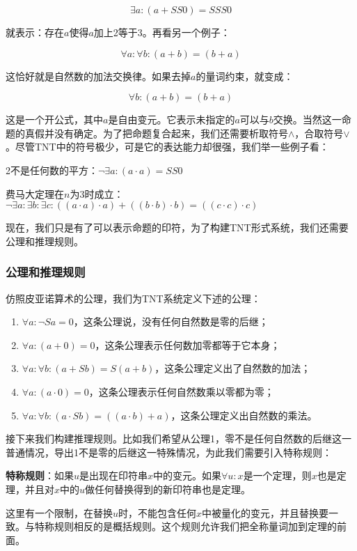 \documentclass{article}
\begin{document}
\[
\exists a : (a + SS0) = SSS0
\]

就表示：存在$a$使得$a$加上2等于3。再看另一个例子：

\[
\forall a : \forall b : (a + b) = (b + a)
\]

这恰好就是自然数的加法交换律。如果去掉$a$的量词约束，就变成：

\[
\forall b : (a + b) = (b + a)
\]

这是一个开公式，其中$a$是自由变元。它表示未指定的$a$可以与$b$交换。当然这一命题的真假并没有确定。为了把命题复合起来，我们还需要析取符号$\land$，合取符号$\lor$。尽管TNT中的符号极少，可是它的表达能力却很强，我们举一些例子看：

2不是任何数的平方：$\lnot \exists a : (a \cdot a) = SS0$

费马大定理在$n$为3时成立：$\lnot \exists a : \exists b : \exists c : ((a \cdot a) \cdot a) + ((b \cdot b) \cdot b) = ((c \cdot c) \cdot c)$

现在，我们只是有了可以表示命题的印符，为了构建TNT形式系统，我们还需要公理和推理规则。

\subsubsection{公理和推理规则}

仿照皮亚诺算术的公理，我们为TNT系统定义下述的公理：

\begin{enumerate}
\item $\forall a : \lnot Sa = 0$，这条公理说，没有任何自然数是零的后继；
\item $\forall a: (a + 0) = 0$，这条公理表示任何数加零都等于它本身；
\item $\forall a: \forall b: (a + Sb) = S(a + b)$，这条公理定义出了自然数的加法；
\item $\forall a: (a \cdot 0) = 0$，这条公理表示任何自然数乘以零都为零；
\item $\forall a: \forall b: (a \cdot Sb) = ((a \cdot b) + a)$，这条公理定义出自然数的乘法。
\end{enumerate}

接下来我们构建推理规则。比如我们希望从公理1，零不是任何自然数的后继这一普通情况，导出1不是零的后继这一特殊情况，为此我们需要引入特称规则：

\textbf{特称规则}：如果$u$是出现在印符串$x$中的变元。如果$\forall u: x$是一个定理，则$x$也是定理，并且对$x$中的$u$做任何替换得到的新印符串也是定理。

这里有一个限制，在替换$u$时，不能包含任何$x$中被量化的变元，并且替换要一致。与特称规则相反的是概括规则。这个规则允许我们把全称量词加到定理的前面。
\end{document}

